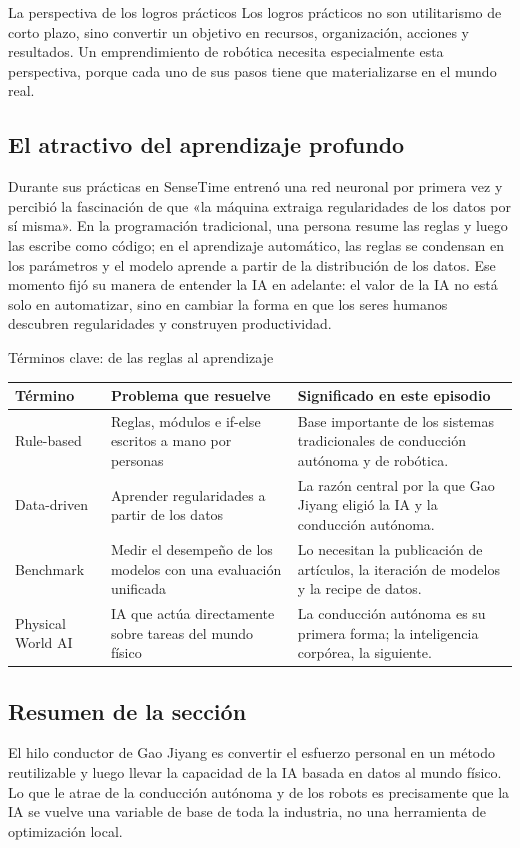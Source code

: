 \begin{importantbox}{La perspectiva de los logros prácticos}
Los logros prácticos no son utilitarismo de corto plazo, sino convertir un objetivo en recursos, organización, acciones y resultados. Un emprendimiento de robótica necesita especialmente esta perspectiva, porque cada uno de sus pasos tiene que materializarse en el mundo real.
\end{importantbox}

\subsection{El atractivo del aprendizaje profundo}

Durante sus prácticas en SenseTime entrenó una red neuronal por primera vez y percibió la fascinación de que «la máquina extraiga regularidades de los datos por sí misma». En la programación tradicional, una persona resume las reglas y luego las escribe como código; en el aprendizaje automático, las reglas se condensan en los parámetros y el modelo aprende a partir de la distribución de los datos. Ese momento fijó su manera de entender la IA en adelante: el valor de la IA no está solo en automatizar, sino en cambiar la forma en que los seres humanos descubren regularidades y construyen productividad.

\begin{knowledgebox}{Términos clave: de las reglas al aprendizaje}
\begin{tabularx}{\textwidth}{p{}p{}X}
\toprule
Término & Problema que resuelve & Significado en este episodio \\
\midrule
Rule-based & Reglas, módulos e if-else escritos a mano por personas & Base importante de los sistemas tradicionales de conducción autónoma y de robótica. \\
Data-driven & Aprender regularidades a partir de los datos & La razón central por la que Gao Jiyang eligió la IA y la conducción autónoma. \\
Benchmark & Medir el desempeño de los modelos con una evaluación unificada & Lo necesitan la publicación de artículos, la iteración de modelos y la recipe de datos. \\
Physical World AI & IA que actúa directamente sobre tareas del mundo físico & La conducción autónoma es su primera forma; la inteligencia corpórea, la siguiente. \\
\bottomrule
\end{tabularx}
\end{knowledgebox}

\subsection{Resumen de la sección}

El hilo conductor de Gao Jiyang es convertir el esfuerzo personal en un método reutilizable y luego llevar la capacidad de la IA basada en datos al mundo físico. Lo que le atrae de la conducción autónoma y de los robots es precisamente que la IA se vuelve una variable de base de toda la industria, no una herramienta de optimización local.
